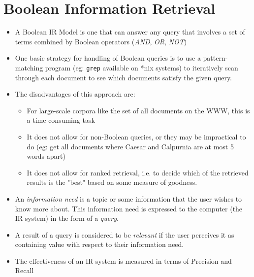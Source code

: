 \documentclass{article}
\begin{document}
\section{Boolean Information Retrieval}
\begin{itemize}
    \item A Boolean IR Model is one that can answer any query that involves a set of terms combined by Boolean operators (\textit{AND}, \textit{OR}, \textit{NOT})
    
    \item One basic strategy for handling of Boolean queries is to use a pattern-matching program (eg: \texttt{grep} available on *nix systems) to iteratively scan through each document to see which documents satisfy the given query.
    
    \item The disadvantages of this approach are:
    \begin{itemize}
        \item For large-scale corpora like the set of all documents on the WWW, this is a time consuming task
        
        \item It does not allow for non-Boolean queries, or they may be impractical to do (eg: get all documents where Caesar and Calpurnia are at most 5 words apart)
        
        \item It does not allow for ranked retrieval, i.e. to decide which of the retrieved results is the "best" based on some measure of goodness.
    \end{itemize}
    
    \item An \textit{information need} is a topic or some information that the user wishes to know more about. This information need is expressed to the computer (the IR system) in the form of a \textit{query}.
    
    \item A result of a query is considered to be \textit{relevant} if the user perceives it as containing value with respect to their information need. 
    
    \item The effectiveness of an IR system is measured in terms of Precision and Recall
\end{itemize}
\end{document}
